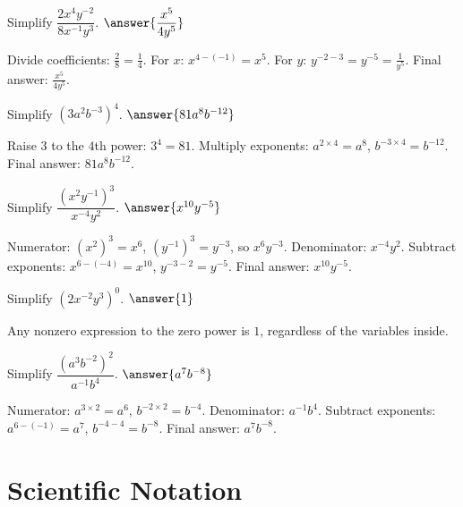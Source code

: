 \documentclass{ximera}
\begin{document}
\begin{problem}
Simplify $\dfrac{2x^4 y^{-2}}{8x^{-1} y^3}$. $\answer{\dfrac{x^5}{4y^5}}$
\begin{feedback}
Divide coefficients: $\frac{2}{8} = \frac{1}{4}$. For $x$: $x^{4-(-1)} = x^5$. For $y$: $y^{-2-3} = y^{-5} = \frac{1}{y^5}$. Final answer: $\frac{x^5}{4y^5}$.
\end{feedback}
\end{problem}

\begin{problem}
Simplify $(3a^2 b^{-3})^4$. $\answer{81a^8 b^{-12}}$
\begin{feedback}
Raise $3$ to the $4$th power: $3^4 = 81$. Multiply exponents: $a^{2 \times 4} = a^8$, $b^{-3 \times 4} = b^{-12}$. Final answer: $81a^8 b^{-12}$.
\end{feedback}
\end{problem}

\begin{problem}
Simplify $\dfrac{(x^2 y^{-1})^3}{x^{-4} y^2}$. $\answer{x^{10} y^{-5}}$
\begin{feedback}
Numerator: $(x^2)^3 = x^6$, $(y^{-1})^3 = y^{-3}$, so $x^6 y^{-3}$. Denominator: $x^{-4} y^2$. Subtract exponents: $x^{6-(-4)} = x^{10}$, $y^{-3-2} = y^{-5}$. Final answer: $x^{10} y^{-5}$.
\end{feedback}
\end{problem}

\begin{problem}
Simplify $(2x^{-2} y^3)^0$. $\answer{1}$
\begin{feedback}
Any nonzero expression to the zero power is $1$, regardless of the variables inside.
\end{feedback}
\end{problem}

\begin{problem}
Simplify $\dfrac{(a^3 b^{-2})^2}{a^{-1} b^4}$. $\answer{a^7 b^{-8}}$
\begin{feedback}
Numerator: $a^{3 \times 2} = a^6$, $b^{-2 \times 2} = b^{-4}$. Denominator: $a^{-1} b^4$. Subtract exponents: $a^{6-(-1)} = a^7$, $b^{-4-4} = b^{-8}$. Final answer: $a^7 b^{-8}$.
\end{feedback}
\end{problem}


\section*{Scientific Notation}
\end{document}
